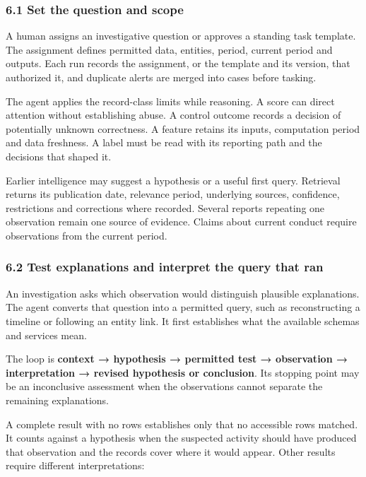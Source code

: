 \documentclass[
  11pt,
]{article}
\begin{document}
\hypertarget{set-the-question-and-scope}{%
\subsubsection{6.1 Set the question and
scope}\label{set-the-question-and-scope}}

A human assigns an investigative question or approves a standing task
template. The assignment defines permitted data, entities, period,
current period and outputs. Each run records the assignment, or the
template and its version, that authorized it, and duplicate alerts are
merged into cases before tasking.

The agent applies the record-class limits while reasoning. A score can
direct attention without establishing abuse. A control outcome records a
decision of potentially unknown correctness. A feature retains its
inputs, computation period and data freshness. A label must be read with
its reporting path and the decisions that shaped it.

Earlier intelligence may suggest a hypothesis or a useful first query.
Retrieval returns its publication date, relevance period, underlying
sources, confidence, restrictions and corrections where recorded.
Several reports repeating one observation remain one source of evidence.
Claims about current conduct require observations from the current
period.

\hypertarget{test-explanations-and-interpret-the-query-that-ran}{%
\subsubsection{6.2 Test explanations and interpret the query that
ran}\label{test-explanations-and-interpret-the-query-that-ran}}

An investigation asks which observation would distinguish plausible
explanations. The agent converts that question into a permitted query,
such as reconstructing a timeline or following an entity link. It first
establishes what the available schemas and services mean.

The loop is \textbf{context → hypothesis → permitted test → observation
→ interpretation → revised hypothesis or conclusion}. Its stopping point
may be an inconclusive assessment when the observations cannot separate
the remaining explanations.

A complete result with no rows establishes only that no accessible rows
matched. It counts against a hypothesis when the suspected activity
should have produced that observation and the records cover where it
would appear. Other results require different interpretations:
\end{document}
